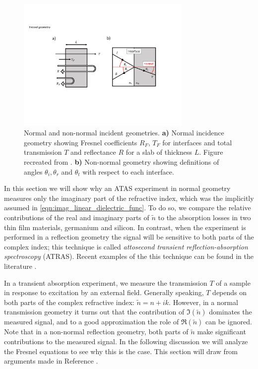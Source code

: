 \begin{figure}
	\centering
	\includegraphics[width=0.75\textwidth]{figures/chap1/Fresnel_Geometry.pdf}
	\caption{Normal and non-normal incident geometries. \textbf{a)} Normal incidence geometry showing Fresnel coefficients $R_F$, $T_F$ for interfaces and total transmission $T$ and reflectance $R$ for a slab of thickness $L$. Figure recreated from \cite{nichelattiComplexRefractiveIndex2002}. \textbf{b)} Non-normal geometry showing definitions of angles $\theta_i, \theta_r$ and $\theta_t$ with respect to each interface.}
	\label{fig:Fresnel_Geometry}
\end{figure}

In this section we will show why an ATAS experiment in normal geometry measures only the imaginary part of the refractive index, which was the implicitly assumed in \cref{eqn:imag_linear_dielectric_func}. To do so, we compare the relative contributions of the real and imaginary parts of $\tilde{n}$ to the absorption losses in two thin film materials, germanium and silicon. In contrast, when the experiment is performed in a reflection geometry the signal will be sensitive to both parts of the complex index; this technique is called \textit{attosecond transient reflection-absorption spectroscopy} (ATRAS). Recent examples of the this technique can be found in the literature \cite{cirriAchievingSurfaceSensitivity2017,kaplanFemtosecondTrackingCarrier2018}.

In a transient absorption experiment, we measure the transmission $T$ of a sample in response to excitation by an external field. Generally speaking, $T$ depends on both parts of the complex refractive index: $\tilde{n} = n + i k$. However, in a normal transmission geometry it turns out that the contribution of $\Im(\tilde{n})$ dominates the measured signal, and to a good approximation the role of $\Re(\tilde{n})$ can be ignored. Note that in a non-normal reflection geometry, both parts of $\tilde{n}$ make significant contributions to the measured signal. In the following discussion we will analyze the Fresnel equations to see why this is the case. This section will draw from arguments made in Reference \cite{nichelattiComplexRefractiveIndex2002}.

